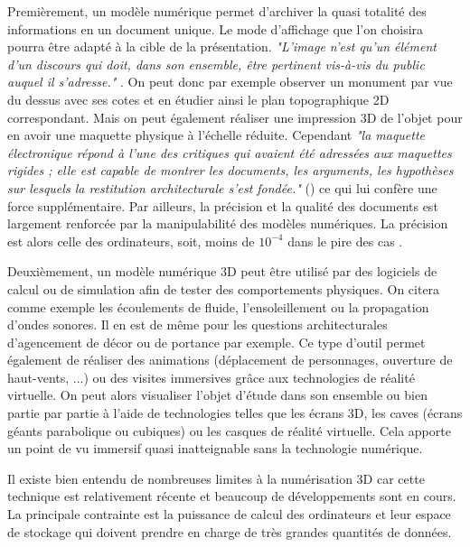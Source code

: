 		Premièrement, un modèle numérique permet d'archiver la quasi totalité des informations en un document unique. Le mode d'affichage que l'on choisira pourra être adapté à la cible de la présentation. \textit{"L’image n’est qu’un élément d’un discours qui doit, dans son ensemble, être pertinent vis-à-vis du public auquel il s’adresse."} \cite{golvin}. On peut donc par exemple observer un monument par vue du dessus avec ses cotes et en étudier ainsi le plan topographique 2D correspondant. Mais on peut également réaliser une impression 3D de l'objet pour en avoir une maquette physique à l'échelle réduite. Cependant \textit{"la maquette électronique répond à l’une des critiques qui avaient été adressées aux maquettes rigides ; elle est capable de montrer les documents, les arguments, les hypothèses sur lesquels la restitution architecturale s’est fondée."} (\cite{golvin}) ce qui lui confère une force supplémentaire. Par ailleurs, la précision et la qualité des documents est largement renforcée par la manipulabilité des modèles numériques. La précision est alors celle des ordinateurs, soit, moins de $10^{-4}$ dans le pire des cas \cite{precisionmachine}. 
		 
		 Deuxièmement, un modèle numérique 3D peut être utilisé par des logiciels de calcul ou de simulation afin de tester des comportements physiques. On citera comme exemple les écoulements de fluide, l'ensoleillement ou la propagation d'ondes sonores. Il en est de même pour les questions architecturales d'agencement de décor ou de portance par exemple. Ce type d'outil permet également de réaliser des animations (déplacement de personnages, ouverture de haut-vents, ...) ou des visites immersives grâce aux technologies de réalité virtuelle. On peut alors visualiser l'objet d'étude dans son ensemble ou bien partie par partie à l'aide de technologies telles que les écrans 3D, les caves (écrans géants parabolique ou cubiques) ou les casques de réalité virtuelle. Cela apporte un point de vu immersif quasi inatteignable sans la technologie numérique.
		 
Il existe bien entendu de nombreuses limites à la numérisation 3D car cette technique est relativement récente et beaucoup de développements sont en cours. La principale contrainte est la puissance de calcul des ordinateurs et leur espace de stockage qui doivent prendre en charge de très grandes quantités de données.

